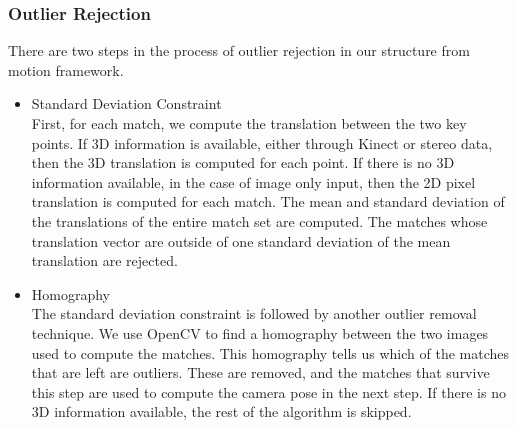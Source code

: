 \subsubsection{Outlier Rejection}
There are two steps in the process of outlier rejection in our structure from motion framework.
\begin{itemize}
\item{Standard Deviation Constraint} \\
	First, for each match, we compute the translation between the two key points. If 3D information is available, either through Kinect or stereo data, then the 3D translation is computed for each point. If there is no 3D information available, in the case of image only input, then the 2D pixel translation is computed for each match. The mean and standard deviation of the translations of the entire match set are computed. The matches whose translation vector are outside of one standard deviation of the mean translation are rejected. 
\item{Homography} \\
	The standard deviation constraint is followed by another outlier removal technique. We use OpenCV to find a homography between the two images used to compute the matches. This homography tells us which of the matches that are left are outliers. These are removed, and the matches that survive this step are used to compute the camera pose in the next step. If there is no 3D information available, the rest of the algorithm is skipped.
\end{itemize}

